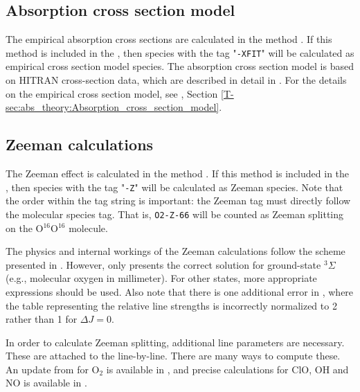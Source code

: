 \subsection{Absorption cross section model}

The empirical absorption cross sections are calculated in the method .
If this method is included in the , then species with the
tag "\verb|-XFIT|" will be calculated as empirical cross section model species. 
The absorption cross section model is based on HITRAN cross-section data, which are described in detail in 
\cite{gordon17:_hitran2016_jqsrt}. For the details on the empirical cross section model, see \theory, 
Section \ref{T-sec:abs_theory:Absorption_cross_section_model}. 

\subsection{Zeeman calculations}
\label{sec:absorption:zeeman}

The Zeeman effect is calculated in the method .
If this method is included in the , then species with the
tag "\verb|-Z|" will be calculated as Zeeman species.
Note that the order within the tag
string is important: the Zeeman tag must directly follow the molecular species
tag. That is, \verb|O2-Z-66| will be counted as Zeeman splitting on the
O$^{16}$O$^{16}$ molecule.

The physics and internal workings of the Zeeman calculations follow the scheme
presented in \citet{larsson14:_treatment_jqsrt}.  However, \citet{larsson14:_treatment_jqsrt}
only presents the correct solution for ground-state $^3\Sigma$ (e.g., molecular oxygen in millimeter).  
For other states, more appropriate expressions should be used.  Also note that there is one
additional error in \citet{larsson14:_treatment_jqsrt}, where the table representing the relative line strengths is
incorrectly normalized to 2 rather than 1 for $\Delta J = 0$.

In order to calculate Zeeman splitting, additional line parameters are necessary. These are attached to the
line-by-line.  There are many ways to compute these.  An update from \citet{larsson14:_treatment_jqsrt}
for O$_2$ is available in \citet{larsson19:_updated_jqsrt}, and precise calculations for {ClO}, {OH} and {NO} is
available in \citet{larsson20:_zeeman_jqsrt}.

